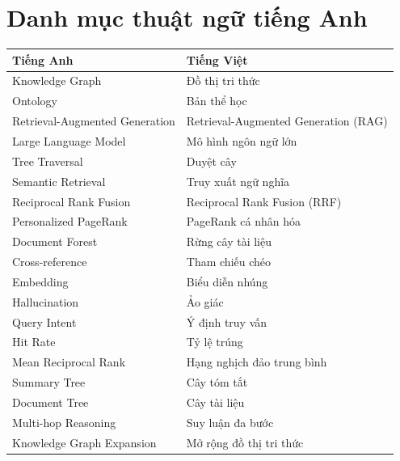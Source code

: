 \chapter*{\centering\Large{Danh mục thuật ngữ tiếng Anh}}
\begin{tabular}{| p{} |p{} |}
\hline
        \textbf{Tiếng Anh} & \textbf{Tiếng Việt} \\
        \hline
        Knowledge Graph & Đồ thị tri thức \\
        \hline
        Ontology & Bản thể học \\
        \hline
        Retrieval-Augmented Generation & Retrieval-Augmented Generation (RAG) \\
        \hline
        Large Language Model & Mô hình ngôn ngữ lớn \\
        \hline
        Tree Traversal & Duyệt cây \\
        \hline
        Semantic Retrieval & Truy xuất ngữ nghĩa \\
        \hline
        Reciprocal Rank Fusion & Reciprocal Rank Fusion (RRF) \\
        \hline
        Personalized PageRank & PageRank cá nhân hóa \\
        \hline
        Document Forest & Rừng cây tài liệu \\
        \hline
        Cross-reference & Tham chiếu chéo \\
        \hline
        Embedding & Biểu diễn nhúng \\
        \hline
        Hallucination & Ảo giác \\
        \hline
        Query Intent & Ý định truy vấn \\
        \hline
        Hit Rate & Tỷ lệ trúng \\
        \hline
        Mean Reciprocal Rank & Hạng nghịch đảo trung bình \\
        \hline
        Summary Tree & Cây tóm tắt \\
        \hline
        Document Tree & Cây tài liệu \\
        \hline
        Multi-hop Reasoning & Suy luận đa bước \\
        \hline
        Knowledge Graph Expansion & Mở rộng đồ thị tri thức \\
        \hline
\end{tabular}
